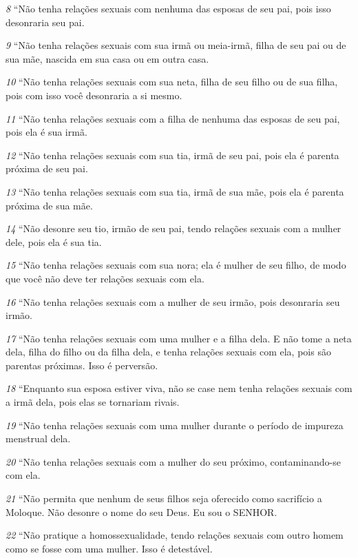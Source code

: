 \smallskip
\textit{\tiny 8} 
“Não tenha relações sexuais com nenhuma das esposas de seu pai, pois isso
desonraria seu pai. 

\smallskip
\textit{\tiny 9} 
“Não tenha relações sexuais com sua irmã ou meia-irmã, filha de seu pai ou de
sua mãe, nascida em sua casa ou em outra casa.

\smallskip
\textit{\tiny 10}
“Não tenha relações sexuais com sua neta, filha de seu filho ou de sua filha,
pois com isso você desonraria a si mesmo.

\smallskip
\textit{\tiny 11}
“Não tenha relações sexuais com a filha de nenhuma das esposas de seu pai,
pois ela é sua irmã.

\smallskip
\textit{\tiny 12}
“Não   tenha relações sexuais com sua tia, irmã de seu pai, pois ela é parenta
próxima de seu pai.

\smallskip
\textit{\tiny 13}
“Não tenha relações sexuais com sua tia, irmã de sua mãe, pois ela é parenta
próxima de sua mãe.

\smallskip
\textit{\tiny 14}
“Não desonre seu tio, irmão de seu pai, tendo relações sexuais com a mulher
dele, pois ela é sua tia.
   
\smallskip
\textit{\tiny 15}
“Não tenha relações sexuais com sua nora; ela é mulher de seu filho, de modo
que você não deve ter relações sexuais com ela.

\smallskip
\textit{\tiny 16}
“Não tenha relações sexuais com a mulher de seu irmão, pois desonraria seu
irmão.
   
\smallskip
\textit{\tiny 17}
“Não tenha relações sexuais com uma mulher e a filha dela. E não tome
 a
neta dela, filha do filho ou da filha dela, e tenha relações sexuais com ela, pois são
parentas próximas. Isso é perversão.

\smallskip
\textit{\tiny 18}
“Enquanto sua esposa estiver viva, não se case nem tenha relações sexuais
com a irmã dela, pois elas se tornariam rivais.
   
\smallskip
\textit{\tiny 19}
“Não tenha relações sexuais com uma mulher durante o período de impureza
menstrual dela.
   
\smallskip
\textit{\tiny 20}
“Não tenha relações sexuais com a mulher do seu próximo, contaminando-se
com ela.
   
\smallskip
\textit{\tiny 21}
“Não permita que nenhum de seus filhos seja oferecido como sacrifício a
Moloque. Não desonre o nome do seu Deus. Eu sou o SENHOR.
   
\smallskip
\textit{\tiny 22}
“Não pratique a homossexualidade, tendo relações sexuais com outro
homem como se fosse com uma mulher. Isso é detestável.
   
